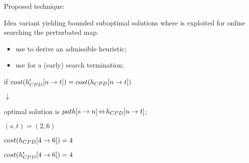 \begin{frame}{Proposed technique: \CPDSearch{}}
    \begin{block}{Idea}
        \A{} variant yielding bounded suboptimal solutions where \CPDPath{} is exploited for online searching the perturbated map.
    \end{block}

    \begin{itemize}
        \item {\color{gray}use \CPD{} to derive an admissible heuristic;}
        \item {use \CPD{} for a (early) search termination;}
    \end{itemize}

    \begin{minipage}{0.65\textwidth}

        \begin{center}
            if $cost(\CPDPathNew{}[n \rightarrow t]) = cost(\CPDPath{}[n \rightarrow t])$
            
            $\downarrow$
            
            optimal solution is $path[s \rightarrow n] \doublePlus{} \CPDPath{}[n \rightarrow t]$;

            \medskip

            $(s, t) = (2, 6)$
        
            $cost(\CPDPath{}[4 \rightarrow 6]) = 4$

            $cost(\CPDPathNew{}[4 \rightarrow 6]) = 4$
        \end{center}
    \end{minipage}\hfill%
    \begin{minipage}{0.35\textwidth}
\end{minipage}
\end{frame}
